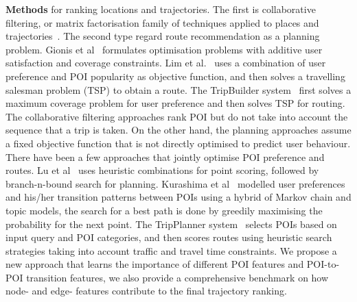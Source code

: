 {\bf Methods} for ranking locations and trajectories. 
The first is collaborative filtering, or matrix factorisation family of techniques applied to places and trajectories~\cite{shi2011personalized,ijcai13,zhang2015location}. The second type regard route recommendation as a planning problem. Gionis et al~\cite{gioniswsdm14} formulates optimisation problems with additive user satisfaction and coverage constraints. Lim et al.~\cite{ijcai15} uses a combination of user preference and POI popularity as objective function, and then solves a travelling salesman problem (TSP) to obtain a route. 
The TripBuilder system~\cite{brilhante2013shall} first solves a maximum coverage problem for user preference and then solves TSP for routing. The collaborative filtering approaches rank POI but do not take into account the sequence that a trip is taken. On the other hand, the planning approaches assume a fixed objective function that is not directly optimised to predict user behaviour. There have been a few approaches that jointly optimise POI preference and routes. Lu et al~\cite{lu2012personalized} uses heuristic combinations for point scoring, followed by branch-n-bound search for planning. Kurashima et al~\cite{kurashima2010geotag} modelled user preferences and his/her transition patterns between POIs using a hybrid of Markov chain and topic models, the search for a best path is done by greedily maximising the probability for the next point. The TripPlanner system~\cite{chen2015tripplanner} selects POIs based on input query and POI categories, and then scores routes using heuristic search strategies taking into account traffic and travel time constraints. 
We propose a new approach that learns the importance of different POI features and POI-to-POI transition features, we also provide a comprehensive benchmark on how node- and edge- features contribute to the final trajectory ranking. 




